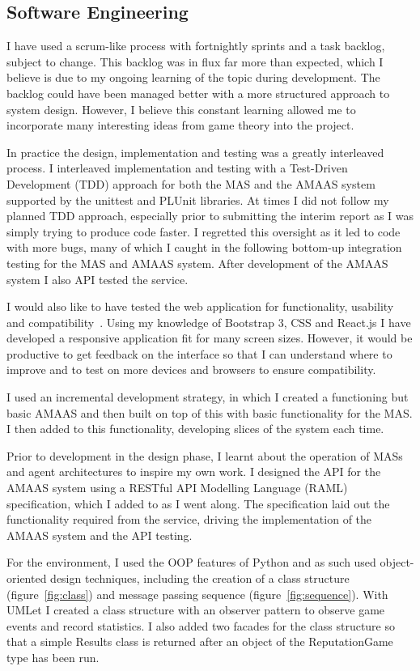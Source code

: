 \documentclass[]{final_report}
\begin{document}
\subsection{Software Engineering}
I have used a scrum-like process with fortnightly sprints and a task backlog, subject to change. This backlog was in flux far more than expected, which I believe is due to my ongoing learning of the topic during development. The backlog could have been managed better with a more structured approach to system design. However, I believe this constant learning allowed me to incorporate many interesting ideas from game theory into the project.\par 
In practice the design, implementation and testing was a greatly interleaved process. I interleaved implementation and testing with a Test-Driven Development (TDD) approach for both the MAS and the AMAAS system supported by the unittest and PLUnit libraries. At times I did not follow my planned TDD approach, especially prior to submitting the interim report as I was simply trying to produce code faster. I regretted this oversight as it led to code with more bugs, many of which I caught in the following bottom-up integration testing for the MAS and AMAAS system. After development of the AMAAS system I also API tested the service.\par 
I would also like to have tested the web application for functionality, usability and compatibility~\cite{guru99_testing, software_testing_help}. Using my knowledge of Bootstrap 3, CSS and React.js I have developed a responsive application fit for many screen sizes. However, it would be productive to get feedback on the interface so that I can understand where to improve and to test on more devices and browsers to ensure compatibility.\par 
I used an incremental development strategy, in which I created a functioning but basic AMAAS and then built on top of this with basic functionality for the MAS. I then added to this functionality, developing slices of the system each time.\par 
Prior to development in the design phase, I learnt about the operation of MASs and agent architectures to inspire my own work. I designed the API for the AMAAS system using a RESTful API Modelling Language (RAML) specification, which I added to as I went along. The specification laid out the functionality required from the service, driving the implementation of the AMAAS system and the API testing.\par 
For the environment, I used the OOP features of Python and as such used object-oriented design techniques, including the creation of a class structure (figure~\ref{fig:class}) and message passing sequence (figure~\ref{fig:sequence}). With UMLet I created a class structure with an observer pattern to observe game events and record statistics. I also added two facades for the class structure so that a simple Results class is returned after an object of the ReputationGame type has been run.\par 
\end{document}
